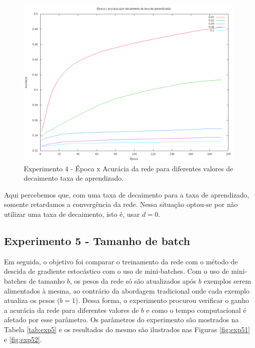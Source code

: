 \documentclass[12pt]{article}
\begin{document}
\begin{figure}[h]
  \centering
  \includegraphics[width=1\textwidth]{../tests/4-lrdecay/graph.png}
  \caption{Experimento 4 - Época x Acurácia da rede para diferentes
  valores de decaimento taxa de aprendizado.}
  \label{fig:exp4}
\end{figure}

Aqui percebemos que, com uma taxa de decaimento para a taxa de
aprendizado, somente retardamos a convergência da rede. Nessa situação
optou-se por não utilizar uma taxa de decaimento, isto é, usar
$ d = 0 $.

\subsection{Experimento 5 - Tamanho de batch}

Em seguida, o objetivo foi comparar o treinamento da rede com o método
de descida de gradiente estocástico com o uso de mini-batches. Com
o uso de mini-batches de tamanho $ b $, os pesos da rede só são atualizados
após $ b $ exemplos serem alimentados à mesma, ao contrário da abordagem
tradicional onde cada exemplo atualiza os pesos ($ b = 1 $). Dessa forma,
o experimento procurou verificar o ganho a acurácia da rede para diferentes
valores de $ b $ e como o tempo computacional é afetado por esse parâmetro.
Os parâmetros do experimento são mostrados na Tabela \ref{tab:exp5} e os
resultados do mesmo são ilustrados nas Figuras \ref{fig:exp51} e
\ref{fig:exp52}.
\end{document}

